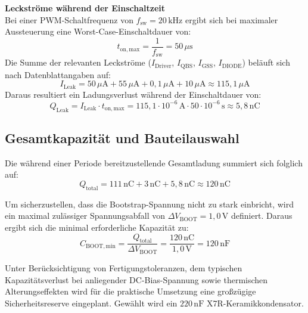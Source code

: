 \textbf{Leckströme während der Einschaltzeit}\\
Bei einer PWM-Schaltfrequenz von $f_{\mathrm{sw}} = 20\,\mathrm{kHz}$ ergibt sich bei maximaler Aussteuerung eine Worst-Case-Einschaltdauer von:
\begin{equation}
    t_{\mathrm{on,max}} = \frac{1}{f_{\mathrm{sw}}} = 50\,\mu\mathrm{s}
\end{equation}
Die Summe der relevanten Leckströme ($I_{\mathrm{Driver}}$, $I_{\mathrm{QBS}}$, $I_{\mathrm{GSS}}$, $I_{\mathrm{DIODE}}$) beläuft sich nach Datenblattangaben auf:
\begin{equation}
    I_{\mathrm{Leak}} = 50\,\mu\mathrm{A} + 55\,\mu\mathrm{A} + 0{,}1\,\mu\mathrm{A} + 10\,\mu\mathrm{A} \approx 115{,}1\,\mu\mathrm{A}
\end{equation}
Daraus resultiert ein Ladungsverlust während der Einschaltdauer von:
\begin{equation}
    Q_{\mathrm{Leak}} = I_{\mathrm{Leak}} \cdot t_{\mathrm{on,max}} = 115{,}1 \cdot 10^{-6}\,\mathrm{A} \cdot 50 \cdot 10^{-6}\,\mathrm{s} \approx 5{,}8\,\mathrm{nC}
\end{equation}

\subsection{Gesamtkapazität und Bauteilauswahl}
Die während einer Periode bereitzustellende Gesamtladung summiert sich folglich auf:
\begin{equation}
    Q_{\mathrm{total}} = 111\,\mathrm{nC} + 3\,\mathrm{nC} + 5{,}8\,\mathrm{nC} \approx 120\,\mathrm{nC}
\end{equation}

Um sicherzustellen, dass die Bootstrap-Spannung nicht zu stark einbricht, wird ein maximal zulässiger Spannungsabfall von $\Delta V_{\mathrm{BOOT}} = 1{,}0\,\mathrm{V}$ definiert. Daraus ergibt sich die minimal erforderliche Kapazität zu:
\begin{equation}
    C_{\mathrm{BOOT,min}} = \frac{Q_{\mathrm{total}}}{\Delta V_{\mathrm{BOOT}}} = \frac{120\,\mathrm{nC}}{1{,}0\,\mathrm{V}} = 120\,\mathrm{nF}
\end{equation}

Unter Berücksichtigung von Fertigungstoleranzen, dem typischen Kapazitätsverlust bei anliegender DC-Bias-Spannung sowie thermischen Alterungseffekten wird für die praktische Umsetzung eine großzügige Sicherheitsreserve eingeplant. Gewählt wird ein $220\,\mathrm{nF}$ X7R-Keramikkondensator.